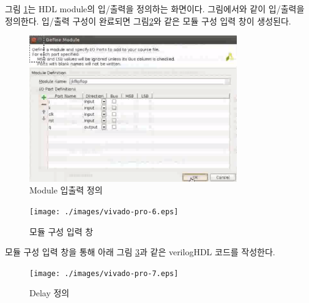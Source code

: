 \documentclass[11pt
  , a4paper
  , article
  , oneside
]{memoir}
\begin{document}
\clearpage

그림 \ref{fig:vivado_5}는 HDL module의 입/출력을 정의하는 화면이다. 그림에서와 같이 입/출력을 정의한다. 입/출력 구성이 완료되면 그림\ref{fig:vivado_6}와 같은 모듈 구성 입력 창이 생성된다.

\begin{figure}[h!]
	\centering
	\includegraphics[width=0.8\textwidth, height=0.4\textwidth]{./images/vivado-pro-5.eps}
	\caption{Module 입출력 정의}
	\label{fig:vivado_5} 
\end{figure}	

\begin{figure}[h!]
	\centering
	\texttt{[image: ./images/vivado-pro-6.eps]}
	\caption{모듈 구성 입력 창}
	\label{fig:vivado_6} 
\end{figure}	

모듈 구성 입력 창을 통해 아래 그림 \ref{fig:vivado_7}과 같은 verilogHDL 코드를 작성한다.

\begin{figure}[h!]
	\centering
	\texttt{[image: ./images/vivado-pro-7.eps]}
	\caption{Delay 정의}
	\label{fig:vivado_7} 
\end{figure}
	
\clearpage
\end{document}
